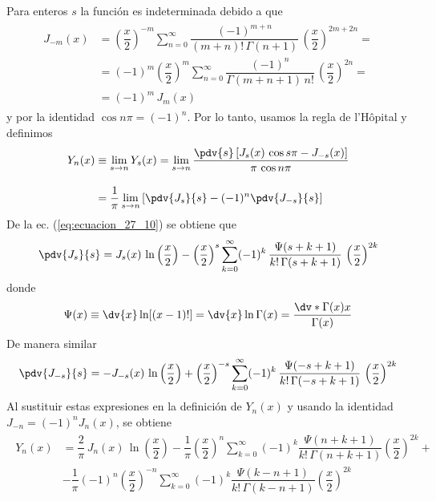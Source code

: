 Para enteros $s$ la función es indeterminada debido a que
\begin{align}
\begin{aligned}
J_{-m}(x) &= \left(\dfrac{x}{2} \right)^{-m} \sum_{n=0}^{\infty} \dfrac{(-1)^{m+n}}{(m+n)! \, \Gamma(n+1)} \, \left( \dfrac{x}{2} \right)^{2m +2n} = \\
&= (-1)^{m} \left( \dfrac{x}{2} \right)^{m} \sum_{n=0}^{\infty} \dfrac{(-1)^{n}}{\Gamma(m+n+1) \, n!} \, \left( \dfrac{x}{2} \right)^{2n} = \\
&= (-1)^{m} \, J_{m}(x)    
\end{aligned}
\label{ecuacion_11_32}
\end{align}
y por la identidad $\cos n \pi = (-1)^{n}$. Por lo tanto, usamos la regla de l'Hôpital y definimos
\begin{align*}
Y_{n}(x) &\equiv \lim_{s \to n} Y_{s} (x) = \lim_{s \to n} \dfrac{\displaystyle \pdv{s} \left[ J_{s}(x) \,\cos s \pi - J_{-s}(x) \right]}{\pi \, \cos n \pi} \\[1em]
&= \dfrac{1}{\pi} \lim_{s \to n} \left[ \pdv{J_{s}}{s} - (-1)^{n} \pdv{J_{-s}}{s} \right]
\end{align*}
De la ec. (\ref{eq:ecuacion_27_10}) se obtiene que
\begin{align*}
\pdv{J_{s}}{s} = J_{s} (x) \, \ln \left( \dfrac{x}{2} \right) - \left( \dfrac{x}{2} \right)^{s} \sum_{k=0}^{\infty} (-1)^{k} \, \dfrac{\Psi(s + k + 1)}{k! \, \Gamma(s + k + 1)} \, \left( \dfrac{x}{2} \right)^{2k}
\end{align*}
donde
\begin{align*}
\Psi (x) \equiv \dv{x} \ln[(x - 1)!] = \dv{x} \ln \Gamma (x) = \dfrac{\dv*{\Gamma(x)}{x}}{\Gamma (x)}
\end{align*}
De manera similar
\begin{align*}
\pdv{J_{-s}}{s} = -J_{-s} (x) \, \ln \left( \dfrac{x}{2} \right) + \left( \dfrac{x}{2} \right)^{-s} \sum_{k=0}^{\infty} (-1)^{k} \, \dfrac{\Psi(-s + k + 1)}{k! \, \Gamma(-s + k + 1)} \, \left( \dfrac{x}{2} \right)^{2k}
\end{align*}
Al sustituir estas expresiones en la definición de $Y_{n}(x)$ y usando la identidad $J_{-n} = (-1)^{n} J_{n}(x)$, se obtiene
\begin{align}
\begin{aligned}
Y_{n} (x) &= \dfrac{2}{\pi} \, J_{n} (x) \, \ln \left(\dfrac{x}{2} \right) - \dfrac{1}{\pi} \left( \dfrac{x}{2} \right)^{n} \sum_{k=0}^{\infty} (-1)^{k} \dfrac{\Psi (n + k + 1)}{k! \, \Gamma (n + k + 1)} \left(\dfrac{x}{2} \right)^{2k} + \\
&- \dfrac{1}{\pi} (-1)^{n} \left( \dfrac{x}{2} \right)^{-n} \sum_{k=0}^{\infty} (-1)^{k} \dfrac{\Psi (k - n + 1)}{k! \, \Gamma (k - n + 1)} \left(\dfrac{x}{2} \right)^{2k}
\end{aligned}
\label{eq:ecuacion_27_12}
\end{align}

